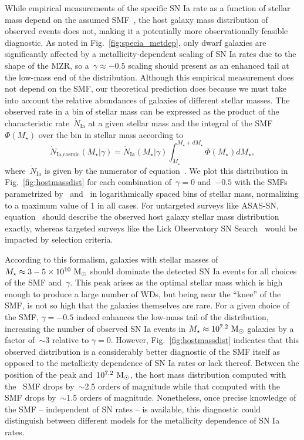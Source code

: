 \documentclass[ms.tex]{subfiles}
\begin{document}
While empirical measurements of the specific SN Ia rate as a function of
stellar mass depend on the assumed SMF~\citep{Gandhi2022}, the host galaxy
mass distribution of observed events does not, making it a potentially more
observationally feasible diagnostic.
As noted in Fig.~\ref{fig:specia_metdep}, only dwarf galaxies are
significantly affected by a metallicity-dependent scaling of SN Ia rates due to
the shape of the MZR, so a~$\gamma \approx -0.5$ scaling should present as an
enhanced tail at the low-mass end of the distribution.
Although this empirical measurement does not depend on the SMF, our theoretical
prediction does because we must take into account the relative abundances of
galaxies of different stellar masses.
The observed rate in a bin of stellar mass can be expressed as the product
of the characteristic rate~$\dot{N}_\text{Ia}$ at a given stellar mass and
the integral of the SMF~$\Phi(M_\star)$ over the bin in stellar mass according
to
\begin{equation}
\dot{N}_\text{Ia,cosmic}(M_\star | \gamma) = \dot{N}_\text{Ia}(M_\star | \gamma)
\int_{M_\star}^{M_\star + dM_\star} \Phi(M_\star) dM_\star,
\label{eq:hostmassdist}
\end{equation}
where~$\dot{N}_\text{Ia}$ is given by the numerator of
equation~.
We plot this distribution in Fig.~\ref{fig:hostmassdist} for each combination
of~$\gamma = 0$ and~$-0.5$ with the SMFs parametrized by~\citet{Bell2003}
and~\citet{Baldry2012} in logarithmically spaced bins of stellar mass,
normalizing to a maximum value of 1 in all cases.
For untargeted surveys like ASAS-SN, equation~ should
describe the observed host galaxy stellar mass distribution exactly, whereas
targeted surveys like the Lick Observatory SN Search~\citep[LOSS;][]{Li2000,
Filippenko2001} would be impacted by selection criteria.
\par
According to this formalism, galaxies with stellar masses of
$M_\star \approx 3-5 \times10^{10}~\text{M}_\odot$ should dominate the detected SN Ia
events for all choices of the SMF and~$\gamma$.
This peak arises as the optimal stellar mass which is high enough to produce a
large number of WDs, but being near the ``knee'' of the SMF, is not so high
that the galaxies themselves are rare.
For a given choice of the SMF, $\gamma = -0.5$ indeed enhances the low-mass
tail of the distribution, increasing the number of observed SN Ia events in
$M_\star \approx 10^{7.2}~\text{M}_\odot$ galaxies by a factor of~$\sim$3 relative to
$\gamma = 0$.
However, Fig.~\ref{fig:hostmassdist} indicates that this observed distribution
is a considerably better diagnostic of the SMF itself as opposed to the
metallicity dependence of SN Ia rates or lack thereof.
Between the position of the peak and~$10^{7.2}~\text{M}_\odot$, the host mass
distribution computed with the~\citet{Bell2003} SMF drops by~$\sim$2.5 orders
of magnitude while that computed with the~\citet{Baldry2012} SMF drops
by~$\sim$1.5 orders of magnitude.
Nonetheless, once precise knowledge of the SMF -- independent of SN rates -- is
available, this diagnostic could distinguish between different models for the
metallicity dependence of SN Ia rates.
\end{document}

